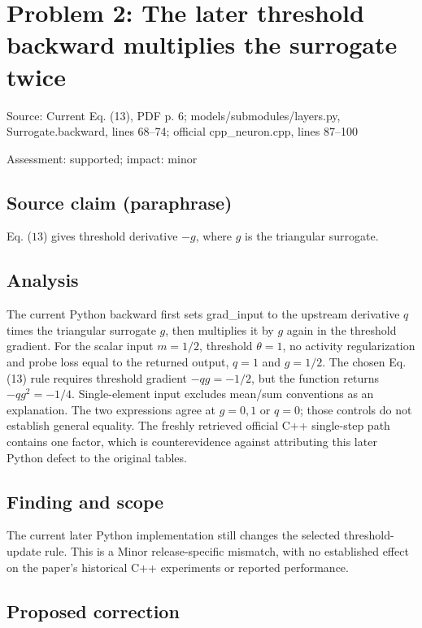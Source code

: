 \documentclass[11pt]{article}
\begin{document}
\section*{Problem 2: The later threshold backward multiplies the surrogate twice}

Source: Current Eq. (13), PDF p. 6; models/submodules/layers.py, Surrogate.backward, lines 68–74; official cpp\_neuron.cpp, lines 87–100

Assessment: supported; impact: minor

\subsection*{Source claim (paraphrase)}

Eq. (\(13\)) gives threshold derivative \(-g\), where \(g\) is the triangular surrogate.

\subsection*{Analysis}

The current Python backward first sets grad\_input to the upstream derivative \(q\) times the triangular surrogate \(g\), then multiplies it by \(g\) again in the threshold gradient. For the scalar input \(m=1/2\), threshold \(\theta=1\), no activity regularization and probe loss equal to the returned output, \(q=1\) and \(g=1/2\). The chosen Eq. (13) rule requires threshold gradient \(-qg=-1/2\), but the function returns \(-qg^2=-1/4\). Single-element input excludes mean/sum conventions as an explanation. The two expressions agree at \(g=0,1\) or \(q=0\); those controls do not establish general equality. The freshly retrieved official C++ single-step path contains one factor, which is counterevidence against attributing this later Python defect to the original tables.

\subsection*{Finding and scope}

The current later Python implementation still changes the selected threshold-update rule. This is a Minor release-specific mismatch, with no established effect on the paper’s historical C++ experiments or reported performance.

\subsection*{Proposed correction}
\end{document}

